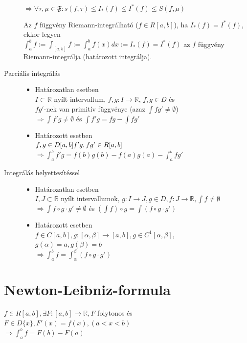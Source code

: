 \documentclass[margin=0px]{article}
\newcommand{\R}{\mathbb{R}}
\begin{document}
\begin{description}
        $ \Rightarrow \forall \tau,\mu \in \mathfrak{F} : s(f, \tau) \leq I_*(f) \leq I^*(f) \leq S(f,\mu) $

        Az $ f $ függvény Riemann-integrálható ($ f \in R[a,b] $), ha $ I_*(f) = I^*(f) $, ekkor legyen \\
        $ \int_{a}^{b}f := \int_{[a,b]}f := \int_{a}^{b}f(x) dx := I_*(f) = I^*(f) $ az $f$ függvény Riemann-integrálja (határozott integrálja).

    \item[Parciális integrálás] \hfill
        \begin{itemize}
            \item Határozatlan esetben \hfill \\
                  $ I \subset \R $ nyílt intervallum, $ f,g : I \rightarrow \R $, $f,g \in D$ és \\
                  $ fg'$-nek van primitív függvénye (azaz $ \int fg' \neq \emptyset $)\\
                  $ \Rightarrow \int f'g \neq \emptyset $ és $ \int f'g = fg - \int fg' $
            \item Határozott esetben \hfill \\
                  $ f,g \in D[a,b] \\ f'g, f g' \in R[a,b] $ \\
                  $ \Rightarrow \int_a^b f'g = f(b)g(b) - f(a)g(a) - \int_a^b fg'$
        \end{itemize}

    \item[Integrálás helyettesítéssel] \hfill
        \begin{itemize}
            \item Határozatlan esetben \hfill \\
                  $ I,J \subset \R $ nyílt intervallumok, $g: I \rightarrow J,  g \in D, f:J \rightarrow \R, \int f \neq \emptyset $ \\
                  $\Rightarrow \int f \circ g\cdot g' \neq \emptyset $ és $ (\int f) \circ g = \int(f\circ g\cdot g') $
            \item Határozott esetben \hfill \\
                  $ f \in C[a,b], g : [\alpha,\beta] \rightarrow [a,b], g \in C^1[\alpha,\beta],$\\
                  $g(\alpha) = a, g(\beta) = b $ \\
                  $ \Rightarrow \int_a^b f = \int_{\alpha}^{\beta} (f\circ g \cdot g')$
        \end{itemize}
\end{description}
\section{Newton-Leibniz-formula}

$ f \in R[a,b], \exists F:[a,b] \rightarrow \R, F $ folytonos és $ F \in D\{x\}, F'(x) = f(x), (a < x < b) $ \\
$ \Rightarrow \int_a^b f = F(b) - F(a) $
\end{document}
